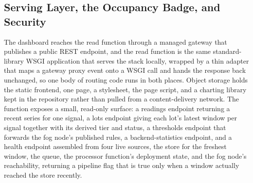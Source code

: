 \documentclass[conference]{IEEEtran}
\begin{document}
\subsection{Serving Layer, the Occupancy Badge, and Security}

The dashboard reaches the read function through a managed gateway that publishes a public REST endpoint, and the read function is the same standard-library WSGI application that serves the stack locally, wrapped by a thin adapter that maps a gateway proxy event onto a WSGI call and hands the response back unchanged, so one body of routing code runs in both places. Object storage holds the static frontend, one page, a stylesheet, the page script, and a charting library kept in the repository rather than pulled from a content-delivery network. The function exposes a small, read-only surface: a readings endpoint returning a recent series for one signal, a lots endpoint giving each lot's latest window per signal together with its derived tier and status, a thresholds endpoint that forwards the fog node's published rules, a backend-statistics endpoint, and a health endpoint assembled from four live sources, the store for the freshest window, the queue, the processor function's deployment state, and the fog node's reachability, returning a pipeline flag that is true only when a window actually reached the store recently.
\end{document}
